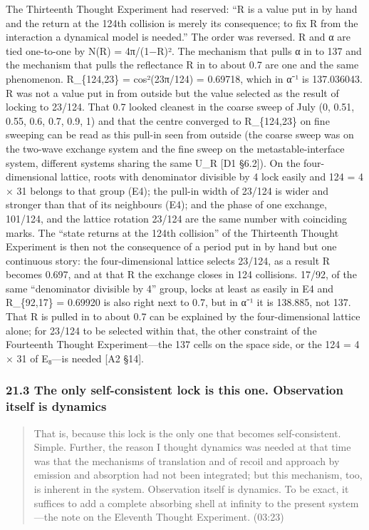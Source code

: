 \documentclass[
  a4paper,
]{article}
\begin{document}
The Thirteenth Thought Experiment had reserved: ``R is a value put in by
hand and the return at the 124th collision is merely its consequence; to
fix R from the interaction a dynamical model is needed.'' The order was
reversed. R and α are tied one-to-one by N(R) = 4π/(1−R)². The mechanism
that pulls α in to 137 and the mechanism that pulls the reflectance R in
to about 0.7 are one and the same phenomenon. R\_\{124,23\} =
cos²(23π/124) = 0.69718, which in α⁻¹ is 137.036043. R was not a value
put in from outside but the value selected as the result of locking to
23/124. That 0.7 looked cleanest in the coarse sweep of July (0, 0.51,
0.55, 0.6, 0.7, 0.9, 1) and that the centre converged to R\_\{124,23\}
on fine sweeping can be read as this pull-in seen from outside (the
coarse sweep was on the two-wave exchange system and the fine sweep on
the metastable-interface system, different systems sharing the same U\_R
{[}D1 §6.2{]}). On the four-dimensional lattice, roots with denominator
divisible by 4 lock easily and 124 = 4 × 31 belongs to that group (E4);
the pull-in width of 23/124 is wider and stronger than that of its
neighbours (E4); and the phase of one exchange, 101/124, and the lattice
rotation 23/124 are the same number with coinciding marks. The ``state
returns at the 124th collision'' of the Thirteenth Thought Experiment is
then not the consequence of a period put in by hand but one continuous
story: the four-dimensional lattice selects 23/124, as a result R
becomes 0.697, and at that R the exchange closes in 124 collisions.
17/92, of the same ``denominator divisible by 4'' group, locks at least
as easily in E4 and R\_\{92,17\} = 0.69920 is also right next to 0.7,
but in α⁻¹ it is 138.885, not 137. That R is pulled in to about 0.7 can
be explained by the four-dimensional lattice alone; for 23/124 to be
selected within that, the other constraint of the Fourteenth Thought
Experiment---the 137 cells on the space side, or the 124 = 4 × 31 of
E₈---is needed {[}A2 §14{]}.

\subsubsection{21.3 The only self-consistent lock is this one.
Observation itself is
dynamics}\label{the-only-self-consistent-lock-is-this-one.-observation-itself-is-dynamics}

\begin{quote}
That is, because this lock is the only one that becomes self-consistent.
Simple. Further, the reason I thought dynamics was needed at that time
was that the mechanisms of translation and of recoil and approach by
emission and absorption had not been integrated; but this mechanism,
too, is inherent in the system. Observation itself is dynamics. To be
exact, it suffices to add a complete absorbing shell at infinity to the
present system---the note on the Eleventh Thought Experiment. (03:23)
\end{quote}
\end{document}
